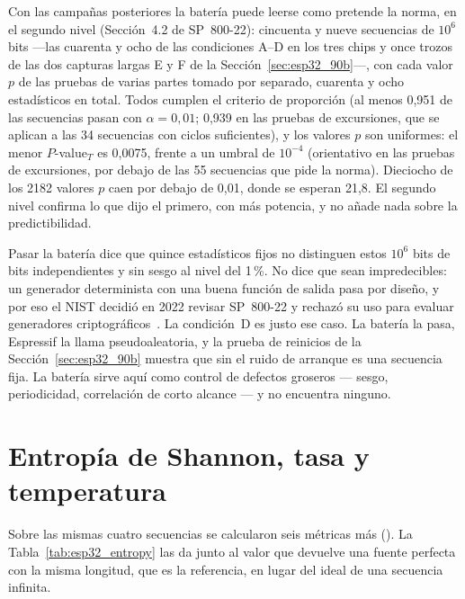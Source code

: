 Con las campañas posteriores la batería puede leerse como pretende la
norma, en el segundo nivel (Sección~4.2 de SP~800-22): cincuenta y nueve
secuencias de $10^6$ bits ---las cuarenta y ocho de las condiciones A--D
en los tres chips y once trozos de las dos capturas largas E y F de la
Sección~\ref{sec:esp32_90b}---, con cada valor $p$ de las pruebas de
varias partes tomado por separado, cuarenta y ocho estadísticos en total.
Todos cumplen el criterio de proporción (al menos 0,951 de las secuencias
pasan con $\alpha = 0{,}01$; 0,939 en las pruebas de excursiones, que se
aplican a las 34 secuencias con ciclos suficientes), y los valores $p$
son uniformes: el menor $P$-value$_T$ es 0,0075, frente a un umbral de
$10^{-4}$ (orientativo en las pruebas de excursiones, por debajo de las
55 secuencias que pide la norma). Dieciocho de los 2182 valores $p$ caen
por debajo de 0,01, donde se esperan 21,8. El segundo nivel confirma lo
que dijo el primero, con más potencia, y no añade nada sobre la
predictibilidad.

Pasar la batería dice que quince estadísticos fijos no distinguen estos
$10^6$ bits de bits independientes y sin sesgo al nivel del 1\,\%. No dice que sean
impredecibles: un generador determinista con una buena función de salida
pasa por diseño, y por eso el NIST decidió en 2022 revisar SP~800-22 y
rechazó su uso para evaluar generadores
criptográficos~\cite{nist_2022_decision}. La condición~D es justo ese caso.
La batería la pasa, Espressif la llama pseudoaleatoria, y la prueba de
reinicios de la Sección~\ref{sec:esp32_90b} muestra que sin el ruido de
arranque es una secuencia fija. La batería sirve aquí como control de
defectos groseros --- sesgo, periodicidad, correlación de corto alcance
--- y no encuentra ninguno.

\section{Entropía de Shannon, tasa y temperatura}
\label{sec:esp32_shannon}

Sobre las mismas cuatro secuencias se calcularon seis métricas más
(). La
Tabla~\ref{tab:esp32_entropy} las da junto al valor que devuelve una
fuente perfecta con la misma longitud, que es la referencia, en lugar del
ideal de una secuencia infinita.

